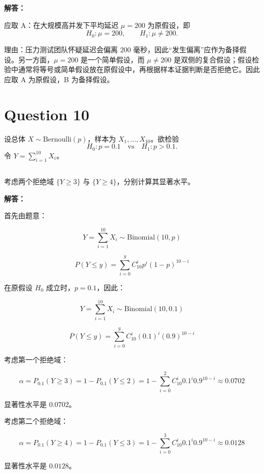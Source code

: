 \documentclass[12pt,a4paper]{article}
\begin{document}
\begin{answerbox}
\textbf{解答：}


应取 A：在大规模高并发下平均延迟 $\mu=200$ 为原假设，即
\[
H_0:\mu=200,\qquad H_1:\mu\neq 200.
\]

理由：压力测试团队怀疑延迟会偏离 $200$ 毫秒，因此“发生偏离”应作为备择假设。另一方面，$\mu=200$ 是一个简单假设，而 $\mu\neq 200$ 是双侧的复合假设；假设检验中通常将等号或简单假设放在原假设中，再根据样本证据判断是否拒绝它。因此应取 A 为原假设，B 为备择假设。

\end{answerbox}

\section{Question 10}

设总体 $X \sim \text{Bernoulli}(p)$，样本为 $X_1,\ldots,X_{10}$。欲检验
\[
H_0: p = 0.1 \quad \text{vs} \quad H_1: p > 0.1.
\]
令 $Y = \sum_{i=1}^{10}X_i$。

\subsection{}

考虑两个拒绝域 $\{Y \geq 3\}$ 与 $\{Y \geq 4\}$，分别计算其显著水平。

\begin{answerbox}
\textbf{解答：}

首先由题意：

$$
Y = \sum_{i=1}^{10}X_i \sim \text{Binomial}(10, p)
$$

$$
P\left(Y \leq y\right) = \sum_{i = 0}^{y} C_{10}^{i} p^i (1-p)^{10-i}
$$

在原假设 $H_0$ 成立时，$p = 0.1$，因此：

$$
Y = \sum_{i=1}^{10}X_i \sim \text{Binomial}(10, 0.1)
$$

$$
 P\left(Y \leq y\right) = \sum_{i = 0}^{y} C_{10}^{i} (0.1)^i (0.9)^{10-i}
$$

考虑第一个拒绝域：

$$
\alpha = P_{0.1}\left(Y\geq 3\right) = 1 - P_{0.1}\left(Y\leq 2\right) = 1 - \sum_{i = 0}^{2}C_{10}^{i} 0.1^i 0.9^{10-i} \approx 0.0702
$$

显著性水平是 $0.0702$。

考虑第二个拒绝域：

$$
\alpha = P_{0.1}\left(Y\geq 4\right) = 1 - P_{0.1}\left(Y\leq 3\right) = 1 - \sum_{i = 0}^{3}C_{10}^{i} 0.1^i 0.9^{10-i} \approx 0.0128
$$

显著性水平是 $0.0128$。

\end{answerbox}
\end{document}
